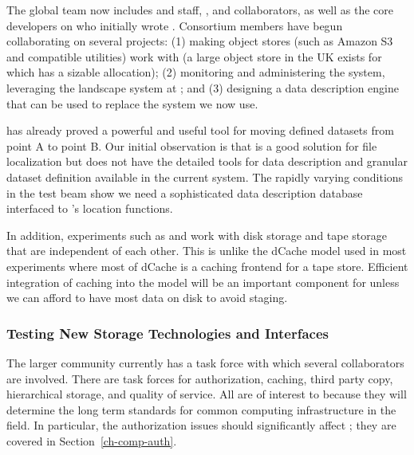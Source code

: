 The global  team now includes  and  staff, , and  collaborators, as well as the core developers on  who initially wrote .  Consortium members have begun collaborating on several projects:  (1) making object stores (such as Amazon S3 and compatible utilities) work with  (a large object store in the UK exists for which  has a sizable allocation);  (2) monitoring  and administering the  system, leveraging the landscape system at ; and  (3) designing a  data description engine that can be used to replace the  system we now use.



 has already proved a powerful and useful tool for moving defined datasets from point A to point B.  Our initial observation is that  is a good solution for file localization but does not have the detailed tools for data description and granular dataset definition available in the current  system.  The rapidly varying conditions in the test beam show we need a sophisticated data description database interfaced to 's location functions. 

In addition,  experiments such as  and  work with disk storage and tape storage that are independent of each other.  This is unlike the dCache model used in most  experiments where most of dCache is a caching frontend for a tape store.  Efficient integration of caching into the  model will be an important component for  unless we can afford to have most data on disk to avoid staging.



\subsubsection{Testing New Storage Technologies and Interfaces}

The larger  community\cite{Berzano:2018xaa} currently has a  task force
 with which several  collaborators are involved. There are task forces for authorization, caching, third party copy, hierarchical storage, and quality of service. All are of interest to  because they will determine the long term standards for common computing infrastructure in the field. 
In particular, the authorization issues should significantly affect ; they are covered in Section~\ref{ch-comp-auth}.


